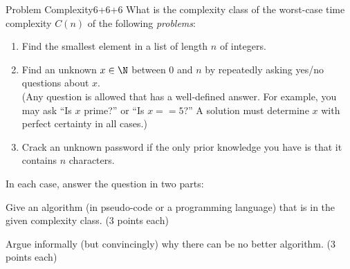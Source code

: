 \documentclass[a4paper]{article}
\begin{document}
\header

\begin{problem}{Problem Complexity}{6+6+6}
What is the complexity class of the worst-case time complexity $C(n)$ of the following \emph{problems}:
\begin{enumerate}
\item Find the smallest element in a list of length $n$ of integers.
\item Find an unknown $x\in \N$ between $0$ and $n$ by repeatedly asking yes/no questions about $x$.\\
(Any question is allowed that has a well-defined answer. For example, you may ask ``Is $x$ prime?'' or ``Is $x==5$?'' A solution must determine $x$ with perfect certainty in all cases.)
\item Crack an unknown password if the only prior knowledge you have is that it contains $n$ characters.
\end{enumerate}

In each case, answer the question in two parts:
\begin{compactitem}
\item Give an algorithm (in pseudo-code or a programming language) that is in the given complexity class. (3 points each)
\item Argue informally (but convincingly) why there can be no better algorithm. (3 points each)
\end{compactitem}


\end{problem}
\end{document}
